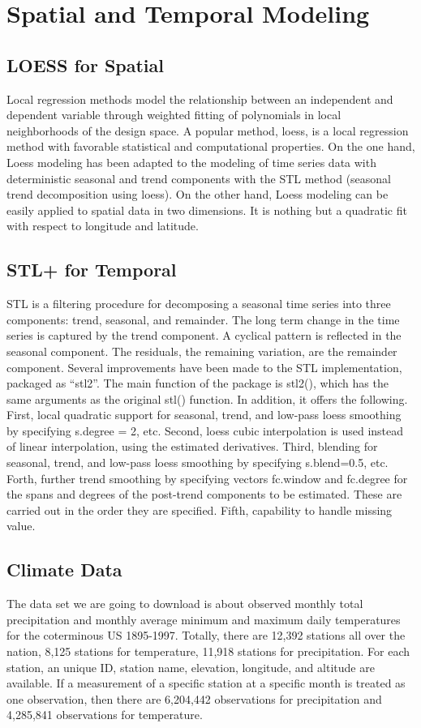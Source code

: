 \section{Spatial and Temporal Modeling}

\subsection{LOESS for Spatial}
Local regression methods model the relationship between an independent and dependent variable 
through weighted fitting of polynomials in local neighborhoods of the design space. A popular 
method, loess, is a local regression method with favorable statistical and computational properties.
On the one hand, Loess modeling has been adapted to the modeling of time series data with 
deterministic seasonal and trend components with the STL method (seasonal trend decomposition using 
loess). On the other hand, Loess modeling can be easily applied to spatial data in two dimensions. 
It is nothing but a quadratic fit with respect to longitude and latitude. 

\subsection{STL+ for Temporal}
STL is a filtering procedure for decomposing a seasonal time series into three components: trend,
seasonal, and remainder. The long term change in the time series is captured by the trend component.
A cyclical pattern is reflected in the seasonal component. The residuals, the remaining variation, 
are the remainder component.
Several improvements have been made to the STL implementation, packaged as “stl2”. The main function
of the package is stl2(), which has the same arguments as the original stl() function. In addition, 
it offers the following. First, local quadratic support for seasonal, trend, and low-pass loess 
smoothing by specifying s.degree = 2, etc. Second, loess cubic interpolation is used instead of 
linear interpolation, using the estimated derivatives. Third, blending for seasonal, trend, and 
low-pass loess smoothing by specifying s.blend=0.5, etc. Forth, further trend smoothing by 
specifying vectors fc.window and fc.degree for the spans and degrees of the post-trend components to 
be estimated. These are carried out in the order they are specified. Fifth, capability to handle 
missing value.

\subsection{Climate Data}
The data set we are going to download is about observed monthly total precipitation and monthly 
average minimum and maximum daily temperatures for the coterminous US 1895-1997. Totally, there are 
12,392 stations all over the nation, 8,125 stations for temperature, 11,918 stations for 
precipitation. For each station, an unique ID, station name, elevation, longitude, and altitude are
available. If a measurement of a specific station at a specific month is treated as one observation,
then there are 6,204,442 observations for precipitation and 4,285,841 observations for temperature. 

